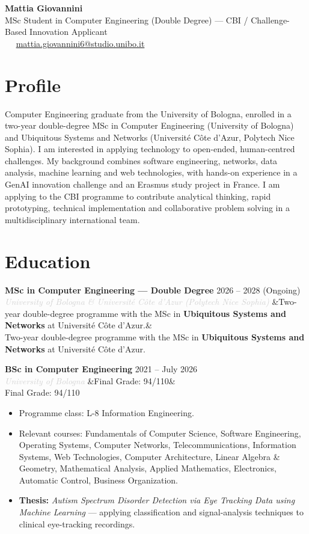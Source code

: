 \documentclass[a4paper,10pt]{article}
\newcommand{\entry}[4]{%
  \noindent\textbf{#1} \hfill \textcolor{accent}{#2}\\
  \textit{\textcolor{lightgray}{#3}}%
  \ifx&#4&\else\\\vspace{0.2em}#4\fi
  \vspace{0.5em}
}
\newcommand{\entrylist}[5]{%
  \noindent\textbf{#1} \hfill \textcolor{accent}{#2}\\
  \textit{\textcolor{lightgray}{#3}}%
  \ifx&#4&\else\\\vspace{0.2em}#4\fi
  \vspace{0.25em}
  \begin{itemize}#5\end{itemize}
  \vspace{0.25em}
}
\begin{document}
\begin{center}
  {\Huge\bfseries\color{darkgray} Mattia Giovannini}\\[0.35em]
  {\large\color{accent} MSc Student in Computer Engineering (Double Degree) — CBI / Challenge-Based Innovation Applicant}\\[0.65em]
  \textcolor{lightgray}{
    \faPhone\ \PrivatePhone
    \quad\textbullet\quad
    \faEnvelope\ \href{mailto:mattia.giovannini6@studio.unibo.it}{mattia.giovannini6@studio.unibo.it}
  }
\end{center}

\vspace{0.35em}

\section{Profile}

Computer Engineering graduate from the University of Bologna, enrolled in a two-year
double-degree MSc in Computer Engineering (University of Bologna) and Ubiquitous Systems and Networks (Université Côte d'Azur, Polytech Nice Sophia). I am interested
in applying technology to open-ended, human-centred challenges. My background combines software
engineering, networks, data analysis, machine learning and web technologies, with hands-on
experience in a GenAI innovation challenge and an Erasmus study project in France. I am applying
to the CBI programme to contribute analytical thinking, rapid prototyping, technical implementation
and collaborative problem solving in a multidisciplinary international team.

\section{Education}

\entry{MSc in Computer Engineering — Double Degree}{2026 -- 2028 (Ongoing)}{University of Bologna \& Université Côte d'Azur (Polytech Nice Sophia)}
{Two-year double-degree programme with the MSc in \textbf{Ubiquitous Systems and Networks} at Université Côte d'Azur.}

\entrylist{BSc in Computer Engineering}{2021 -- July 2026}{University of Bologna}{Final Grade: 94/110}{
  \item Programme class: L-8 Information Engineering.
  \item Relevant courses: Fundamentals of Computer Science, Software Engineering, Operating Systems,
        Computer Networks, Telecommunications, Information Systems, Web Technologies, Computer Architecture,
        Linear Algebra \& Geometry, Mathematical Analysis, Applied Mathematics, Electronics,
        Automatic Control, Business Organization.
  \item \textbf{Thesis:} \textit{Autism Spectrum Disorder Detection via Eye Tracking Data using Machine Learning} — applying classification and signal-analysis techniques to clinical eye-tracking recordings.
}
\end{document}
